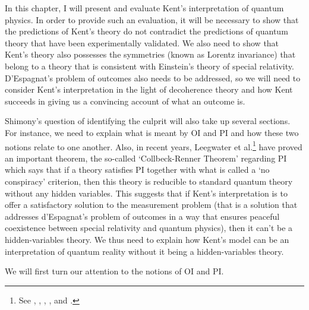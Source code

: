In this chapter, I will present and evaluate Kent's interpretation of quantum physics. In order to provide such an evaluation, it will be necessary to show that the predictions of Kent's theory do not contradict the  predictions of quantum theory that have been experimentally validated. We also need to show that Kent's theory also possesses the symmetries (known as Lorentz invariance) that belong to a theory that is consistent with Einstein's theory of special relativity. D'Espagnat's problem of outcomes also needs to be addressed, so we will need to consider  Kent's interpretation in the light of decoherence theory and how Kent succeeds in giving us a convincing account of what an outcome is.

Shimony's question of identifying the culprit will also take up several sections. For instance, we need to explain what is meant by OI and PI and how these two notions relate to one another. Also, in recent years,  Leegwater et al.\footnote{See \cite{LeegwaterGijs2016Aitf}, \cite{ColbeckRoger2011Neoq}, \cite{ColbeckRoger2012Tcoq}, \cite{LandsmanK2015OtCt}, and \cite{Landsman}.} have  proved an important theorem, the so-called {`Collbeck-Renner Theorem'} regarding PI which says that if a theory satisfies PI together with what is called a {`no conspiracy'} criterion,\label{noconspiracy} then this theory is reducible to standard quantum theory without any hidden variables. This suggests that if Kent's interpretation is to offer a satisfactory solution to the measurement problem (that is a solution that addresses d'Espagnat's problem of outcomes in a way that  ensures peaceful coexistence between special relativity and quantum physics), then it can't be a hidden-variables theory. We thus need to explain how Kent's model can be an interpretation of quantum reality without it being a hidden-variables theory. 

We will first turn our attention to the notions of OI and PI.
